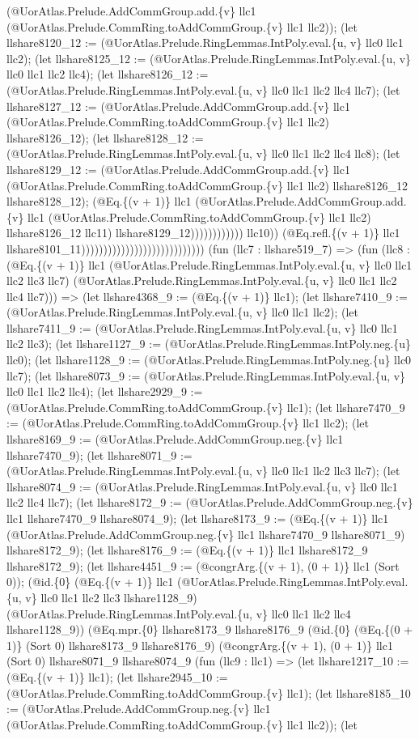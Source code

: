 \documentclass[11pt]{article}
\begin{document}
(@UorAtlas.Prelude.AddCommGroup.add.\{v\} llc1 (@UorAtlas.Prelude.CommRing.toAddCommGroup.\{v\} llc1 llc2)); (let llshare8120\_12 := (@UorAtlas.Prelude.RingLemmas.IntPoly.eval.\{u, v\} llc0 llc1 llc2); (let llshare8125\_12 := (@UorAtlas.Prelude.RingLemmas.IntPoly.eval.\{u, v\} llc0 llc1 llc2 llc4); (let llshare8126\_12 := (@UorAtlas.Prelude.RingLemmas.IntPoly.eval.\{u, v\} llc0 llc1 llc2 llc4 llc7); (let llshare8127\_12 := (@UorAtlas.Prelude.AddCommGroup.add.\{v\} llc1 (@UorAtlas.Prelude.CommRing.toAddCommGroup.\{v\} llc1 llc2) llshare8126\_12); (let llshare8128\_12 := (@UorAtlas.Prelude.RingLemmas.IntPoly.eval.\{u, v\} llc0 llc1 llc2 llc4 llc8); (let llshare8129\_12 := (@UorAtlas.Prelude.AddCommGroup.add.\{v\} llc1 (@UorAtlas.Prelude.CommRing.toAddCommGroup.\{v\} llc1 llc2) llshare8126\_12 llshare8128\_12); (@Eq.\{(v + 1)\} llc1 (@UorAtlas.Prelude.AddCommGroup.add.\{v\} llc1 (@UorAtlas.Prelude.CommRing.toAddCommGroup.\{v\} llc1 llc2) llshare8126\_12 llc11) llshare8129\_12)))))))))))) llc10)) (@Eq.refl.\{(v + 1)\} llc1 llshare8101\_11)))))))))))))))))))))))))))) (fun (llc7 : llshare519\_7) => (fun (llc8 : (@Eq.\{(v + 1)\} llc1 (@UorAtlas.Prelude.RingLemmas.IntPoly.eval.\{u, v\} llc0 llc1 llc2 llc3 llc7) (@UorAtlas.Prelude.RingLemmas.IntPoly.eval.\{u, v\} llc0 llc1 llc2 llc4 llc7))) => (let llshare4368\_9 := (@Eq.\{(v + 1)\} llc1); (let llshare7410\_9 := (@UorAtlas.Prelude.RingLemmas.IntPoly.eval.\{u, v\} llc0 llc1 llc2); (let llshare7411\_9 := (@UorAtlas.Prelude.RingLemmas.IntPoly.eval.\{u, v\} llc0 llc1 llc2 llc3); (let llshare1127\_9 := (@UorAtlas.Prelude.RingLemmas.IntPoly.neg.\{u\} llc0); (let llshare1128\_9 := (@UorAtlas.Prelude.RingLemmas.IntPoly.neg.\{u\} llc0 llc7); (let llshare8073\_9 := (@UorAtlas.Prelude.RingLemmas.IntPoly.eval.\{u, v\} llc0 llc1 llc2 llc4); (let llshare2929\_9 := (@UorAtlas.Prelude.CommRing.toAddCommGroup.\{v\} llc1); (let llshare7470\_9 := (@UorAtlas.Prelude.CommRing.toAddCommGroup.\{v\} llc1 llc2); (let llshare8169\_9 := (@UorAtlas.Prelude.AddCommGroup.neg.\{v\} llc1 llshare7470\_9); (let llshare8071\_9 := (@UorAtlas.Prelude.RingLemmas.IntPoly.eval.\{u, v\} llc0 llc1 llc2 llc3 llc7); (let llshare8074\_9 := (@UorAtlas.Prelude.RingLemmas.IntPoly.eval.\{u, v\} llc0 llc1 llc2 llc4 llc7); (let llshare8172\_9 := (@UorAtlas.Prelude.AddCommGroup.neg.\{v\} llc1 llshare7470\_9 llshare8074\_9); (let llshare8173\_9 := (@Eq.\{(v + 1)\} llc1 (@UorAtlas.Prelude.AddCommGroup.neg.\{v\} llc1 llshare7470\_9 llshare8071\_9) llshare8172\_9); (let llshare8176\_9 := (@Eq.\{(v + 1)\} llc1 llshare8172\_9 llshare8172\_9); (let llshare4451\_9 := (@congrArg.\{(v + 1), (0 + 1)\} llc1 (Sort 0)); (@id.\{0\} (@Eq.\{(v + 1)\} llc1 (@UorAtlas.Prelude.RingLemmas.IntPoly.eval.\{u, v\} llc0 llc1 llc2 llc3 llshare1128\_9) (@UorAtlas.Prelude.RingLemmas.IntPoly.eval.\{u, v\} llc0 llc1 llc2 llc4 llshare1128\_9)) (@Eq.mpr.\{0\} llshare8173\_9 llshare8176\_9 (@id.\{0\} (@Eq.\{(0 + 1)\} (Sort 0) llshare8173\_9 llshare8176\_9) (@congrArg.\{(v + 1), (0 + 1)\} llc1 (Sort 0) llshare8071\_9 llshare8074\_9 (fun (llc9 : llc1) => (let llshare1217\_10 := (@Eq.\{(v + 1)\} llc1); (let llshare2945\_10 := (@UorAtlas.Prelude.CommRing.toAddCommGroup.\{v\} llc1); (let llshare8185\_10 := (@UorAtlas.Prelude.AddCommGroup.neg.\{v\} llc1 (@UorAtlas.Prelude.CommRing.toAddCommGroup.\{v\} llc1 llc2)); (let 
\end{document}
